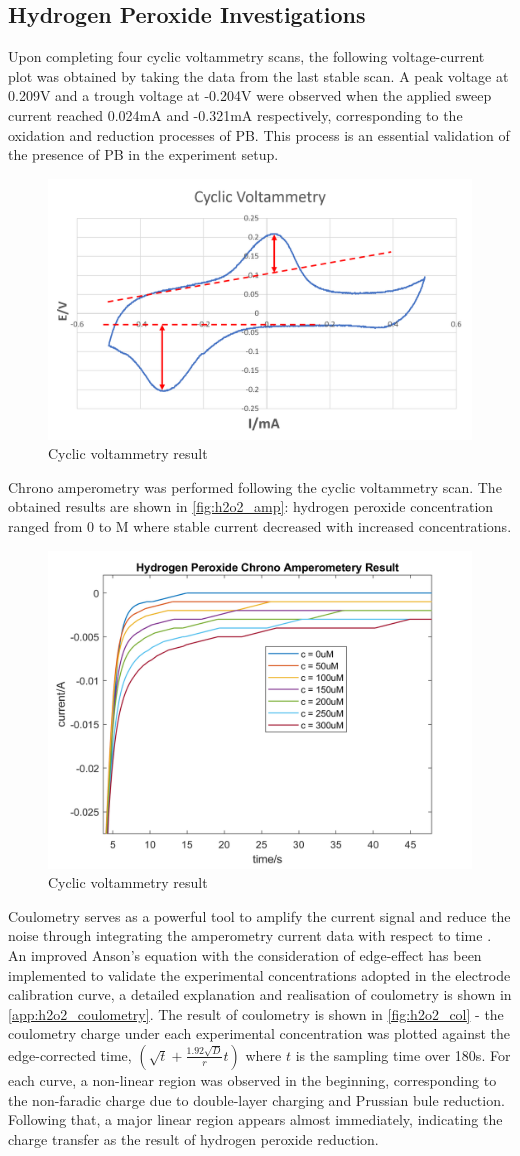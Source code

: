 \subsection{Hydrogen Peroxide Investigations}
Upon completing four cyclic voltammetry scans, the following voltage-current plot was obtained by taking the data from the last stable scan. A peak voltage at 0.209V and a trough voltage at -0.204V were observed when the applied sweep current reached 0.024mA and -0.321mA respectively, corresponding to the oxidation and reduction processes of PB. This process is an essential validation of the presence of PB in the experiment setup.  
\begin{figure}[H]
    \centering
    \includegraphics[width=.5\textwidth]{img/h2o2_cv.png}
    \caption{Cyclic voltammetry result}
    \label{fig:h2o2_cv}
\end{figure}
\noindent Chrono amperometry was performed following the cyclic voltammetry scan. The obtained results are shown in \autoref{fig:h2o2_amp}: hydrogen peroxide concentration ranged from 0 to M where stable current decreased with increased concentrations.
\begin{figure}[H]
    \centering
    \includegraphics[width=.5\textwidth]{img/h2o2_amp.png}
    \caption{Cyclic voltammetry result}
    \label{fig:h2o2_amp}
\end{figure}
\noindent Coulometry serves as a powerful tool to amplify the current signal and reduce the noise through integrating the amperometry current data with respect to time \cite{Anson1966}. An improved Anson's equation with the consideration of edge-effect \cite{Flanagan1973} has been implemented to validate the experimental concentrations adopted in the electrode calibration curve, a detailed explanation and realisation of coulometry is shown in \autoref{app:h2o2_coulometry}. The result of coulometry is shown in \autoref{fig:h2o2_col} - the coulometry charge under each experimental concentration was plotted against the edge-corrected time, $(\sqrt{t}+\frac{1.92\sqrt{D}}{r}t)$ where $t$ is the sampling time over 180s. For each curve, a non-linear region was observed in the beginning, corresponding to the non-faradic charge due to double-layer charging and Prussian bule reduction. Following that, a major linear region appears almost immediately, indicating the charge transfer as the result of hydrogen peroxide reduction.
